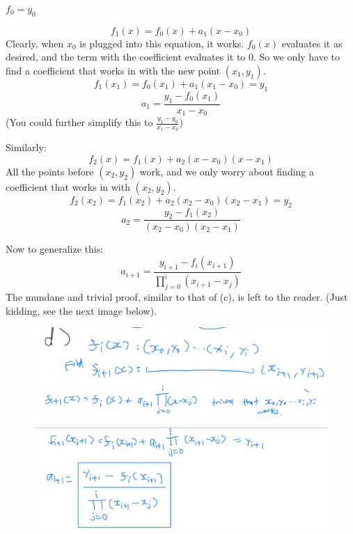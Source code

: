 \documentclass[11pt]{article}
\begin{document}
\begin{solution}\begin{Parts}\Part 
$f_0=y_0$

\Part 
$$f_1(x)=f_0(x)+a_1(x-x_0)$$
Clearly, when $x_0$ is plugged into this equation, it works. 
$f_0(x)$ evaluates it as desired, and the term with the coefficient evaluates it to 0.
So we only have to find a coefficient that works in with the new point $(x_1,y_1)$.
$$f_1(x_1)=f_0(x_1)+a_1(x_1-x_0)=y_1$$
$$a_1=\frac{y_1-f_0(x_1)}{x_1-x_0}$$
(You could further simplify this to $\frac{y_1-y_0}{x_1-x_0}$)

\Part
Similarly:
$$f_2(x)=f_1(x)+a_2(x-x_0)(x-x_1)$$
All the points before $(x_2,y_2)$ work, and we only worry about finding a coefficient that works in with $(x_2,y_2)$.
$$f_2(x_2)=f_1(x_2)+a_2(x_2-x_0)(x_2-x_1)=y_2$$
$$a_2=\frac{y_2-f_1(x_2)}{(x_2-x_0)(x_2-x_1)}$$

\Part 
Now to generalize this:
$$a_{i+1}=\frac{y_{i+1}-f_i(x_{i+1})}{\prod_{j=0}^i(x_{i+1}-x_j)}$$ 
The mundane and trivial proof, similar to that of (c), is left to the reader.
(Just kidding, see the next image below).
\begin{figure}[H]\centering
  \includegraphics[width=0.8\linewidth]{assets/IMG_3283.jpg}
\end{figure}
\end{Parts}\end{solution}
\end{document}
